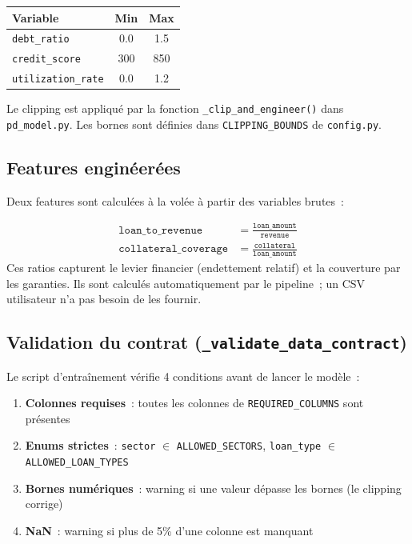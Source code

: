 \documentclass[12pt,a4paper]{article}
\begin{document}
\begin{center}
\begin{tabular}{lcc}
\toprule
\textbf{Variable} & \textbf{Min} & \textbf{Max} \\
\midrule
\texttt{debt\_ratio} & 0.0 & 1.5 \\
\texttt{credit\_score} & 300 & 850 \\
\texttt{utilization\_rate} & 0.0 & 1.2 \\
\bottomrule
\end{tabular}
\end{center}

Le clipping est appliqu\'e par la fonction \texttt{\_clip\_and\_engineer()} dans \texttt{pd\_model.py}. Les bornes sont d\'efinies dans \texttt{CLIPPING\_BOUNDS} de \texttt{config.py}.

\subsection{Features engin\'eer\'ees}

Deux features sont calcul\'ees \`a la vol\'ee \`a partir des variables brutes~:

\begin{formulebox}
\begin{align}
    \texttt{loan\_to\_revenue} &= \frac{\texttt{loan\_amount}}{\texttt{revenue}} \label{eq:ltr} \\[6pt]
    \texttt{collateral\_coverage} &= \frac{\texttt{collateral}}{\texttt{loan\_amount}} \label{eq:cc}
\end{align}
Ces ratios capturent le levier financier (endettement relatif) et la couverture par les garanties. Ils sont calcul\'es automatiquement par le pipeline~; un CSV utilisateur n'a pas besoin de les fournir.
\end{formulebox}

\subsection{Validation du contrat (\texttt{\_validate\_data\_contract})}

Le script d'entra\^inement v\'erifie 4 conditions avant de lancer le mod\`ele~:

\begin{enumerate}[noitemsep]
    \item \textbf{Colonnes requises}~: toutes les colonnes de \texttt{REQUIRED\_COLUMNS} sont pr\'esentes
    \item \textbf{Enums strictes}~: \texttt{sector} $\in$ \texttt{ALLOWED\_SECTORS}, \texttt{loan\_type} $\in$ \texttt{ALLOWED\_LOAN\_TYPES}
    \item \textbf{Bornes num\'eriques}~: warning si une valeur d\'epasse les bornes (le clipping corrige)
    \item \textbf{NaN}~: warning si plus de 5\% d'une colonne est manquant
\end{enumerate}
\end{document}
